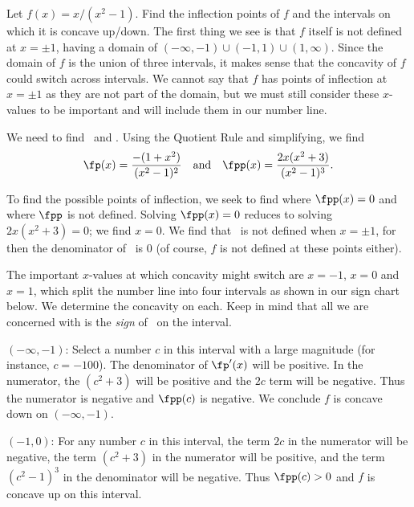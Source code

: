 \begin{example}\label{ex_conc2}
Let $f(x)=x/(x^2-1)$. Find the inflection points of $f$ and the intervals on which it is concave up/down.
\solution
The first thing we see is that $f$ itself is not defined at $x=\pm1$, having a domain of $(-\infty,-1)\cup(-1,1)\cup(1,\infty)$. Since the domain of $f$ is the union of three intervals, it makes sense that the concavity of $f$ could switch across intervals. We cannot say that $f$ has points of inflection at $x=\pm1$ as they are not part of the domain, but we must still consider these $x$-values to be important and will include them in our number line.

We need to find \fp\ and \fpp. Using the Quotient Rule and simplifying, we find
\[
\fp(x)=\frac{-(1+x^2)}{(x^2-1)^2}
\quad \text{and}\quad
\fpp(x) = \frac{2x(x^2+3)}{(x^2-1)^3}.
\]

To find the possible points of inflection, we seek to find where $\fpp(x)=0$ and where $\fpp$ is not defined. Solving $\fpp(x)=0$ reduces to solving $2x(x^2+3)=0$; we find $x=0$.  We find that \fpp\ is not defined when $x=\pm 1$, for then the denominator of \fpp\ is 0 (of course, $f$ is not defined at these points either).

The important $x$-values at which concavity might switch are $x=-1$, $x=0$ and $x=1$, which  split the number line into four intervals as shown in our sign chart below. We determine the concavity on each. Keep in mind that all we are concerned with is the \textit{sign} of \fpp\ on the interval.\bigskip

\iflatexml\begin{description}\else\begin{description}[leftmargin=0pt]\fi
\item[Interval 1,] $(-\infty,-1)$: Select a number $c$ in this interval with a large magnitude (for instance, $c=-100$). The denominator of $\fp'(x)$ will be positive. In the numerator, the $(c^2+3)$ will be positive and the $2c$ term will be negative. Thus the numerator is negative and $\fpp(c)$ is negative. We conclude $f$ is concave down on $(-\infty,-1)$.

\item[Interval 2,] $(-1,0)$: For any number $c$ in this interval, the term $2c$ in the numerator will be negative, the term $(c^2+3)$ in the numerator will be positive, and the term $(c^2-1)^3$ in the denominator will be negative. Thus $\fpp(c)>0$ and $f$ is concave up on this interval.


\end{description}
\end{description}
\end{example}
